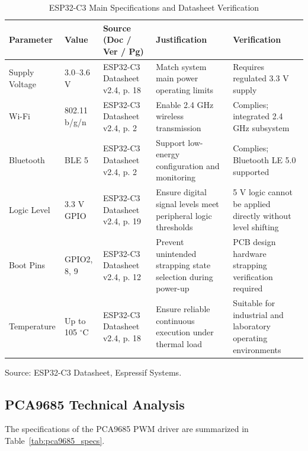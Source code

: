 \documentclass[lettersize,journal]{IEEEtran}
\begin{document}
	\begin{table}[!t]
		\centering
		\caption{ESP32-C3 Main Specifications and Datasheet Verification}
		\label{tab:esp32_specs}
		\scriptsize
		
		\setlength{\tabcolsep}{2pt}
		\renewcommand{\arraystretch}{1.1}
		
		\begin{tabularx}{\columnwidth}{@{}P{1.6cm} P{1.5cm} P{2.1cm} X X@{}}
			\toprule
			\textbf{Parameter} & \textbf{Value} & \textbf{Source (Doc / Ver / Pg)} & \textbf{Justification} & \textbf{Verification} \\
			\midrule
			
			Supply Voltage & 
			3.0--3.6 V & 
			ESP32-C3 Datasheet v2.4, p. 18 & 
			Match system main power operating limits & 
			Requires regulated 3.3 V supply \\
			
			Wi-Fi & 
			802.11 b/g/n & 
			ESP32-C3 Datasheet v2.4, p. 2 & 
			Enable 2.4 GHz wireless transmission & 
			Complies; integrated 2.4 GHz subsystem \\
			
			Bluetooth & 
			BLE 5 & 
			ESP32-C3 Datasheet v2.4, p. 2 & 
			Support low-energy configuration and monitoring & 
			Complies; Bluetooth LE 5.0 supported \\
			
			Logic Level & 
			3.3 V GPIO & 
			ESP32-C3 Datasheet v2.4, p. 19 & 
			Ensure digital signal levels meet peripheral logic thresholds & 
			5 V logic cannot be applied directly without level shifting \\
			
			Boot Pins & 
			GPIO2, 8, 9 & 
			ESP32-C3 Datasheet v2.4, p. 12 & 
			Prevent unintended strapping state selection during power-up & 
			PCB design hardware strapping verification required \\
			
			Temperature & 
			Up to 105 $^\circ$C & 
			ESP32-C3 Datasheet v2.4, p. 18 & 
			Ensure reliable continuous execution under thermal load & 
			Suitable for industrial and laboratory operating environments \\
			
			\bottomrule
		\end{tabularx}
	\end{table}
	
	Source: ESP32-C3 Datasheet, Espressif Systems. \cite{esp32c3}
	
	
	\subsection{PCA9685 Technical Analysis}
	The specifications of the PCA9685 PWM driver are summarized in Table~\ref{tab:pca9685_specs}.
	
\end{document}
